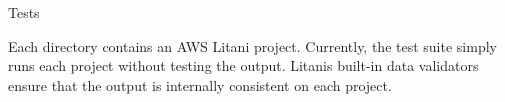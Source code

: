 Tests
\begin{DoxyItemize}
\item Each directory contains an AWS Litani project. Currently, the test suite simply runs each project without testing the output. Litani\textquotesingle{}s built-\/in data validators ensure that the output is internally consistent on each project. 
\end{DoxyItemize}